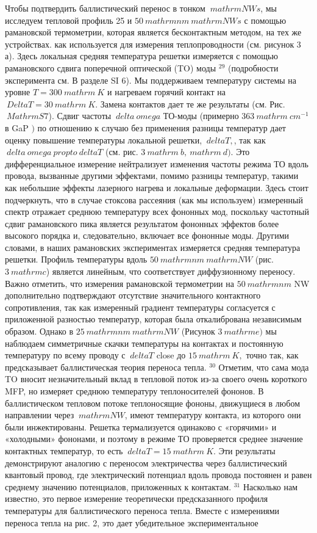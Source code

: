 \documentclass[a4paper, 12pt]{article}%
\begin{document}
Чтобы подтвердить баллистический перенос в тонком $ \ mathrm {NWs} $, мы исследуем тепловой профиль 25 и $ 50 \ mathrm {nm} \ mathrm {NWs} $ с помощью рамановской термометрии, которая является бесконтактным методом, на тех же устройствах. как используется для измерения теплопроводности (см. рисунок 3 а). Здесь локальная средняя температура решетки измеряется с помощью рамановского сдвига поперечной оптической (TO) моды $ {} ^ {29} $ (подробности эксперимента см. В разделе SI 6). Мы поддерживаем температуру системы на уровне $ T = 300 \ mathrm {~ K} $ и нагреваем горячий контакт на $ \ Delta T = 30 \ mathrm {~ K} $. Замена контактов дает те же результаты (см. Рис. $ \ Mathrm {S} 7 $). Сдвиг частоты $ \ delta \ omega $ ТО-моды (примерно $ 363 \ mathrm {~ cm} ^ {- 1} $ в GaP $) $ по отношению к случаю без применения разницы температур дает оценку повышение температуры локальной решетки, $ \ delta T, $, так как $ \ delta \ omega \ propto \ delta T $ (см. рис. $ 3 \ mathrm {~ b}, \ mathrm {~ d}) $. Это дифференциальное измерение нейтрализует изменения частоты режима ТО вдоль провода, вызванные другими эффектами, помимо разницы температур, такими как небольшие эффекты лазерного нагрева и локальные деформации. Здесь стоит подчеркнуть, что в случае стоксова рассеяния (как мы используем) измеренный спектр отражает среднюю температуру всех фононных мод, поскольку частотный сдвиг рамановского пика является результатом фононных эффектов более высокого порядка и, следовательно, включает все фононные моды. Другими словами, в наших рамановских экспериментах измеряется средняя температура решетки. Профиль температуры вдоль $ 50 \ mathrm {nm} \ mathrm {NW} $ (рис. $ 3 \ mathrm {c} $) является линейным, что соответствует диффузионному переносу. Важно отметить, что измерения рамановской термометрии на $ 50 \ mathrm {nm} $ NW дополнительно подтверждают отсутствие значительного контактного сопротивления, так как измеренный градиент температуры согласуется с приложенной разностью температур, которая была откалибрована независимым образом. Однако в $ 25 \ mathrm {nm} \ mathrm {NW} $ (Рисунок $ 3 \ mathrm {e}) $ мы наблюдаем симметричные скачки температуры на контактах и постоянную температуру по всему проводу с $ \ delta T $ close до $ 15 \ mathrm {~ K}, $ точно так, как предсказывает баллистическая теория переноса тепла. $ {} ^ {30} $ Отметим, что сама мода TO вносит незначительный вклад в тепловой поток из-за своего очень короткого MFP, но измеряет среднюю температуру теплоносителей фононов. В баллистическом тепловом потоке теплоносящие фононы, движущиеся в любом направлении через $ \ mathrm {NW} $, имеют температуру контакта, из которого они были инжектированы. Решетка термализуется одинаково с «горячими» и «холодными» фононами, и поэтому в режиме ТО проверяется среднее значение контактных температур, то есть $ \ delta T = 15 \ mathrm {~ K} $. Эти результаты демонстрируют аналогию с переносом электричества через баллистический квантовый провод, где электрический потенциал вдоль провода постоянен и равен среднему значению потенциалов, приложенных к контактам. $ {} ^ {31} $ Насколько нам известно, это первое измерение теоретически предсказанного профиля температуры для баллистического переноса тепла. Вместе с измерениями переноса тепла на рис. 2, это дает убедительное экспериментальное 
\end{document}
